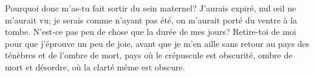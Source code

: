 Pourquoi donc m’as-tu fait sortir du sein maternel?
	J’aurais expiré, nul œil ne m’aurait vu;
	je serais comme n’ayant pas été, on m’aurait porté du ventre à la tombe.
N’est-ce pas peu de chose que la durée de mes jours?
	Retire-toi de moi pour que j’éprouve un peu de joie,
	avant que je m’en aille sans retour
	au pays des ténèbres et de l’ombre de mort,
	pays où le crépuscule est obscurité, ombre de mort et désordre,
	où la clarté même est obscure.
